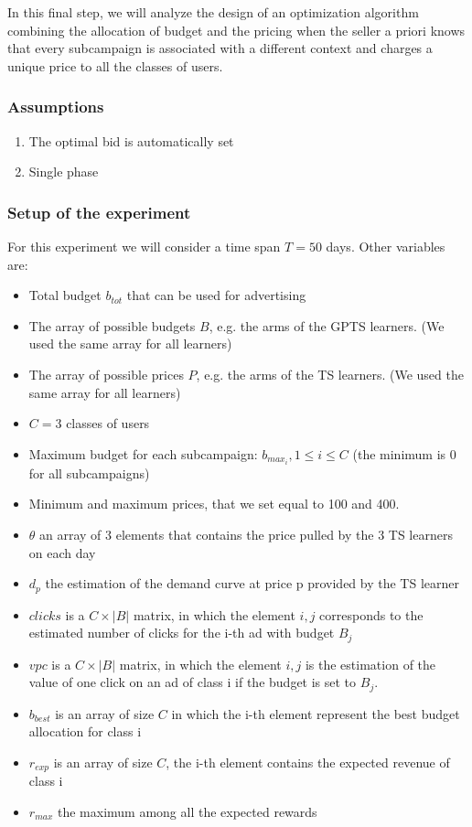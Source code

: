 In this final step, we will analyze the design of an optimization algorithm combining the allocation of budget and the pricing when the seller a priori knows that every subcampaign is associated with a different context and charges a unique price to all the classes of users.

\subsubsection{Assumptions}
\begin{enumerate}
    \item The optimal bid is automatically set
    \item Single phase
\end{enumerate}

\subsubsection{Setup of the experiment}
For this experiment we will consider a time span $T=50$ days. Other variables are:
\begin{itemize}
    \item Total budget $b_{tot}$ that can be used for advertising
    \item The array of possible budgets $B$, e.g. the arms of the GPTS learners. (We used the same array for all learners)
    \item The array of possible prices $P$, e.g. the arms of the TS learners. (We used the same array for all learners)
    \item $C=3$ classes of users
    \item Maximum budget for each subcampaign: $b_{max_i}, 1 \leq i \leq C$ (the minimum is 0 for all subcampaigns)
    \item Minimum and maximum prices, that we set equal to 100 and 400.
    \item $\theta$ an array of 3 elements that contains the price pulled by the 3 TS learners on each day
    \item $d_p$ the estimation of the demand curve at price p provided by the TS learner
    \item $clicks$ is a $C \times |B|$ matrix, in which the element $i,j$ corresponds to the estimated number of clicks for the i-th ad with budget $B_j$
    \item $vpc$ is a $C \times |B|$ matrix, in which the element $i,j$ is the estimation of the value of one click on an ad of class i if the budget is set to $B_j$.
    \item $b_{best}$ is an array of size $C$ in which the i-th element represent the best budget allocation for class i
    \item $r_{exp}$ is an array of size $C$, the i-th element contains the expected revenue of class i
    \item $r_{max}$ the maximum among all the expected rewards
\end{itemize}

